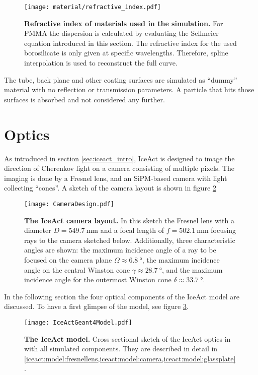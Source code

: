 \begin{figure}[h]
	\centering
	\texttt{[image: material/refractive\_index.pdf]}
	\caption[Refractive index of used materials]{\textbf{Refractive index of materials used in the simulation.} For PMMA the dispersion is calculated by evaluating the Sellmeier equation introduced in this section. The refractive index for the used borosilicate is only given at specific wavelengths. \cite{iceact:borosilicate:datasheet} Therefore, spline interpolation is used to reconstruct the full curve.}
	\label{iceact:model:material:refractive_index}	
\end{figure}

The tube, back plane and other coating surfaces are simulated as \enquote{dummy} material with no reflection or transmission parameters. A particle that hits those surfaces is absorbed and not considered any further.

\section{Optics}

As introduced in section \ref{sec:iceact_intro}, IceAct is designed to image the direction of Cherenkov light on a camera consisting of multiple pixels. The imaging is done by a Fresnel lens, and an SiPM-based camera with light collecting \enquote{cones}. A sketch of the camera layout is shown in figure \ref{iceact:camera:layout}
\begin{figure}[h]
	\centering
	\texttt{[image: CameraDesign.pdf]}
	\caption[IceAct camera layout]{\textbf{The IceAct camera layout.} \cite{iceact:camera} In this sketch the Fresnel lens with a diameter $D=\SI{549.7}{\milli\meter}$ and a focal length of $f=\SI{502.1}{\milli\meter}$ focusing rays to the camera sketched below. Additionally, three characteristic angles are shown: the maximum incidence angle of a ray to be focused on the camera plane $\Omega\approx\SI{6.8}{\degree}$, the maximum incidence angle on the central Winston cone $\gamma\approx\SI{28.7}{\degree}$, and the maximum incidence angle for the outermost Winston cone $\delta\approx\SI{33.7}{\degree}$.}
	\label{iceact:camera:layout}	
\end{figure}

In the following section the four optical components of the IceAct \geant model are discussed. To have a first glimpse of the model, see figure \ref{iceact:model:cut}.
\begin{figure}[h]
	\centering
	\texttt{[image: IceActGeant4Model.pdf]}
	\caption[IceAct \geant model]{\textbf{The IceAct \geant model.} Cross-sectional sketch of the IceAct optics in \geant with all simulated components. They are described in detail in \cref{iceact:model:fresnellens,iceact:model:camera,iceact:model:glassplate}.}
	\label{iceact:model:cut}	
\end{figure}

